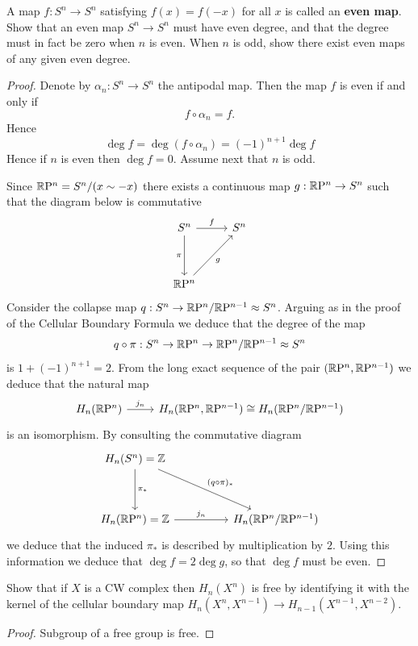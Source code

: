 \begin{exercise}\label{even map even degree}
A map $f:S^n\to S^n$ satisfying $f(x)=f(-x)$ for all $x$ is called an \textbf{even map}. Show that an even map $S^n\to S^n$ must have even degree, and that the degree must in fact be zero when $n$ is even. When $n$ is odd, show there exist even maps of any given even degree.
\end{exercise}
\begin{proof}
Denote by $\alpha_n:S^n\to S^n$ the antipodal map. Then the map $f$ is even if
and only if
\[f\circ\alpha_n=f.\]
Hence 
\[\deg f=\deg(f\circ\alpha_n)=(-1)^{n+1}\deg f\]
Hence if $n$ is even then $\deg f=0$. Assume next that $n$ is odd.\par
Since $\mathbb{R}\mathrm{P}^n=S^n/(x\sim-x)$ there exists a continuous map $g:\mathbb{R}\mathrm{P}^n\to S^n$ such that the diagram below is commutative
\[\begin{tikzcd}
S^n\ar[r,"f"]\ar[dd,swap,"\pi"]&S^n\\
&\\
\RP^n\ar[ruu,swap,"g"]
\end{tikzcd}\]
Consider the collapse map $q:S^n\to\mathbb{R}\mathrm{P}^{n}/\mathbb{R}\mathrm{P}^{n-1}\approx S^n$. Arguing as in the proof of the Cellular Boundary Formula we deduce that the degree of the map
\[q\circ\pi:S^n\to \mathbb{R}\mathrm{P}^n\to\mathbb{R}\mathrm{P}^n/\mathbb{R}\mathrm{P}^{n-1}\approx S^n\]
is $1+(-1)^{n+1}=2$. From the long exact sequence of the pair $(\mathbb{R}\mathrm{P}^n,\mathbb{R}\mathrm{P}^{n-1})$ we deduce that the natural map
\[\begin{tikzcd}
H_n(\RP^n)\ar[r,"j_n"]&H_n(\RP^n,\RP^{n-1})\cong H_n(\RP^n/\RP^{n-1})
\end{tikzcd}\]
is an isomorphism. By consulting the commutative diagram
\[\begin{tikzcd}
H_n(S^n)=\Z\ar[dd,"\pi_*"]\ar[rrdd,"(q\circ\pi)_*"]&&\\
&&\\
H_n(\RP^n)=\Z\ar[rr,"j_n"]&&H_n(\RP^n/\RP^{n-1})
\end{tikzcd}\]
we deduce that the induced $\pi_*$ is described by multiplication by $2$. Using this information we deduce that $\deg f=2\deg g$, so that $\deg f$ must be even.
\end{proof}
\begin{exercise}
Show that if $X$ is a CW complex then $H_n(X^n)$ is free by identifying it with the kernel of the cellular boundary map $H_n(X^n,X^{n-1})\to H_{n-1}(X^{n-1},X^{n-2})$.
\end{exercise}
\begin{proof}
Subgroup of a free group is free.
\end{proof}
